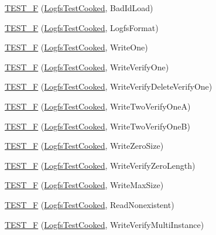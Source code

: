 \begin{DoxyCompactItemize}
\hyperlink{group___unit_tests_ga2ae66629b7714cae9e6b7fa7513e582a}{\-T\-E\-S\-T\-\_\-\-F} (\hyperlink{class_logfs_test_cooked}{\-Logfs\-Test\-Cooked}, \-Bad\-Id\-Load)
\item 
\hyperlink{group___unit_tests_gacaef9b0357724dd62343d2e2c12228f6}{\-T\-E\-S\-T\-\_\-\-F} (\hyperlink{class_logfs_test_cooked}{\-Logfs\-Test\-Cooked}, \-Logfs\-Format)
\item 
\hyperlink{group___unit_tests_gaad108bf9d51537e7a021406dbb72ba8d}{\-T\-E\-S\-T\-\_\-\-F} (\hyperlink{class_logfs_test_cooked}{\-Logfs\-Test\-Cooked}, \-Write\-One)
\item 
\hyperlink{group___unit_tests_ga648a4ec4fd8c6237d8ca35746dd64a9d}{\-T\-E\-S\-T\-\_\-\-F} (\hyperlink{class_logfs_test_cooked}{\-Logfs\-Test\-Cooked}, \-Write\-Verify\-One)
\item 
\hyperlink{group___unit_tests_ga3445631e0cef3272b085ad6f9db3157b}{\-T\-E\-S\-T\-\_\-\-F} (\hyperlink{class_logfs_test_cooked}{\-Logfs\-Test\-Cooked}, \-Write\-Verify\-Delete\-Verify\-One)
\item 
\hyperlink{group___unit_tests_ga1cf14f972876c023077641ba98e63c8b}{\-T\-E\-S\-T\-\_\-\-F} (\hyperlink{class_logfs_test_cooked}{\-Logfs\-Test\-Cooked}, \-Write\-Two\-Verify\-One\-A)
\item 
\hyperlink{group___unit_tests_ga48d1f17dec8bfe59c3012e8cb7d02c97}{\-T\-E\-S\-T\-\_\-\-F} (\hyperlink{class_logfs_test_cooked}{\-Logfs\-Test\-Cooked}, \-Write\-Two\-Verify\-One\-B)
\item 
\hyperlink{group___unit_tests_ga773670f215b2d6d437cf973b562e7208}{\-T\-E\-S\-T\-\_\-\-F} (\hyperlink{class_logfs_test_cooked}{\-Logfs\-Test\-Cooked}, \-Write\-Zero\-Size)
\item 
\hyperlink{group___unit_tests_ga079b8cc84786de4a97f3b1d2ead2aec1}{\-T\-E\-S\-T\-\_\-\-F} (\hyperlink{class_logfs_test_cooked}{\-Logfs\-Test\-Cooked}, \-Write\-Verify\-Zero\-Length)
\item 
\hyperlink{group___unit_tests_ga6ce60ecfc18738ead214a44d47a22c19}{\-T\-E\-S\-T\-\_\-\-F} (\hyperlink{class_logfs_test_cooked}{\-Logfs\-Test\-Cooked}, \-Write\-Max\-Size)
\item 
\hyperlink{group___unit_tests_ga2e5a9acaa02d2c2fa66d03adf200af24}{\-T\-E\-S\-T\-\_\-\-F} (\hyperlink{class_logfs_test_cooked}{\-Logfs\-Test\-Cooked}, \-Read\-Nonexistent)
\item 
\hyperlink{group___unit_tests_ga669c582bc27e4f9ac82e377803246061}{\-T\-E\-S\-T\-\_\-\-F} (\hyperlink{class_logfs_test_cooked}{\-Logfs\-Test\-Cooked}, \-Write\-Verify\-Multi\-Instance)

\end{DoxyCompactItemize}

